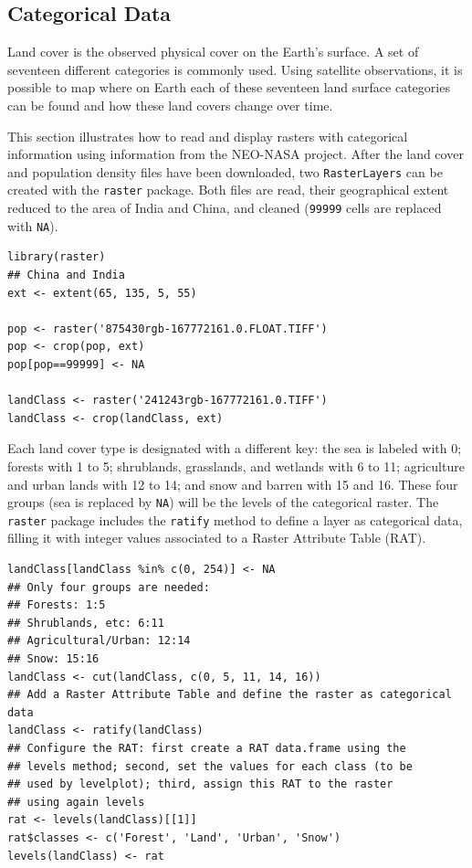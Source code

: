 \subsection{Categorical Data}
\label{sec-1-2}
Land cover is the observed physical cover on the Earth's surface. A
set of seventeen different categories is commonly used. Using
satellite observations, it is possible to map where on Earth each of
these seventeen land surface categories can be found and how these
land covers change over time.

This section illustrates how to read and display rasters with
categorical information using information from the NEO-NASA
project. After the land cover and population density files have been
downloaded, two \texttt{RasterLayers} can be created with the \texttt{raster}
package. Both files are read, their geographical extent reduced to the
area of India and China, and cleaned (\texttt{99999} cells are replaced with
\texttt{NA}).


\lstset{language=R,numbers=none}
\begin{lstlisting}
library(raster)
## China and India  
ext <- extent(65, 135, 5, 55)

pop <- raster('875430rgb-167772161.0.FLOAT.TIFF')
pop <- crop(pop, ext)
pop[pop==99999] <- NA

landClass <- raster('241243rgb-167772161.0.TIFF')
landClass <- crop(landClass, ext)
\end{lstlisting}

Each land cover type is designated with a different key: the sea is
labeled with 0; forests with 1 to 5; shrublands, grasslands, and
wetlands with 6 to 11; agriculture and urban lands with 12 to 14; and
snow and barren with 15 and 16.  These four groups (sea is replaced by
\texttt{NA}) will be the levels of the categorical raster. The \texttt{raster}
package includes the \texttt{ratify} method to define a layer as categorical
data, filling it with integer values associated to a Raster Attribute
Table (RAT).



\lstset{language=R,numbers=none}
\begin{lstlisting}
landClass[landClass %in% c(0, 254)] <- NA
## Only four groups are needed:
## Forests: 1:5
## Shrublands, etc: 6:11
## Agricultural/Urban: 12:14
## Snow: 15:16
landClass <- cut(landClass, c(0, 5, 11, 14, 16))
## Add a Raster Attribute Table and define the raster as categorical data
landClass <- ratify(landClass)
## Configure the RAT: first create a RAT data.frame using the
## levels method; second, set the values for each class (to be
## used by levelplot); third, assign this RAT to the raster
## using again levels
rat <- levels(landClass)[[1]]
rat$classes <- c('Forest', 'Land', 'Urban', 'Snow')
levels(landClass) <- rat
\end{lstlisting}

